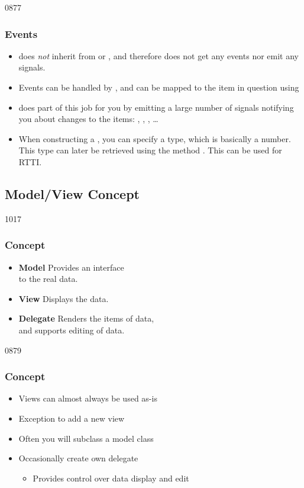 \begin{slide}{0877}\frametitle{Events}
\begin{itemize}
\item {} does \emph{not} inherit from
   or , and therefore does not get any
  events nor emit any signals.
\item Events can be handled by , and can be mapped to the
  item in question using 
\item {} does part of this job for you by emitting a large
  number of signals notifying you about changes to the items:
  , , ,
  \ldots
\item When constructing a , you can specify a type,
  which is basically a number. This type can later be retrieved using the
  method . This can be used for RTTI.
\end{itemize}
\end{slide}

\subsection{Model/View  Concept}
\begin{slide}{1017}\frametitle{Concept}\label{model_view_concepts}
\begin{itemize}
\item \textbf{Model} Provides an interface\\
  to the real data.
\item \textbf{View} Displays the data.
\item \textbf{Delegate} Renders the items of data,\\
  and supports editing of data.
\end{itemize}
\hspace{30mm}
\end{slide}

\begin{slide}[fragile]{0879}\frametitle{Concept}
\begin{itemize}
\item Views can almost always be used as-is
\item Exception to add a new view
\item Often you will subclass a model class
\item Occasionally create own delegate
  \begin{itemize}
  \item  Provides control over data display and edit
  \end{itemize}
\end{itemize}
 
\end{slide}

